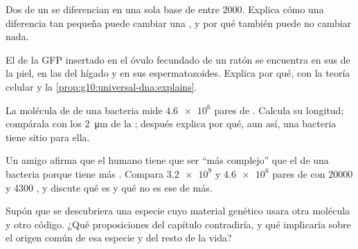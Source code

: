 \begin{exercise}[$\star\star$]\label{exo:g10:universal-dna:10}
Dos  de un  se diferencian en una sola base de entre 2000.
Explica cómo una diferencia tan pequeña puede cambiar una , y
por qué también puede no cambiar nada.
\end{exercise}

\begin{exercise}[$\star\star$]\label{exo:g10:universal-dna:11}
El  de la GFP insertado en el óvulo fecundado de un ratón se
encuentra en sus  de la piel, en las del hígado y en sus
espermatozoides. Explica por qué, con la teoría celular y la
\cref{prop:g10:universal-dna:explains}.
\end{exercise}

\begin{exercise}[$\star\star\star$]\label{exo:g10:universal-dna:12}
La molécula de  de una bacteria mide $\num{4.6e6}$ pares de .
Calcula su longitud; compárala con los \qty{2}{\micro m} de la ;
después explica por qué, aun así, una bacteria tiene sitio para ella.
\end{exercise}

\begin{exercise}[$\star\star\star$]\label{exo:g10:universal-dna:13}
Un amigo afirma que el  humano tiene que ser ``más complejo'' que el
de una bacteria porque tiene más . Compara $\num{3.2e9}$ y
$\num{4.6e6}$ pares de  con $\num{20000}$ y 4300 , y discute
qué es y qué no es ese  de más.
\end{exercise}

\begin{exercise}[$\star\star\star$]\label{exo:g10:universal-dna:14}
Supón que se descubriera una especie cuyo material genético usara otra
molécula y otro código. ¿Qué proposiciones del capítulo contradiría, y
qué implicaría sobre el origen común de esa especie y del resto de la
vida?
\end{exercise}


